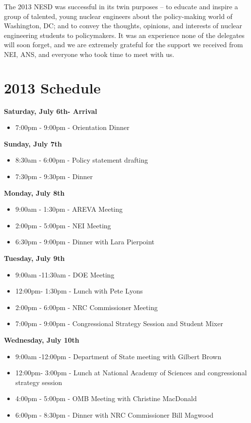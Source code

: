 \documentclass[12pt]{article}
\begin{document}
The 2013 NESD was successful in its twin purposes – to educate and inspire a
group of talented, young nuclear engineers about the policy-making world of
Washington, DC; and to convey the thoughts, opinions, and interests of nuclear
engineering students to policymakers.  It was an experience none of the
delegates will soon forget, and we are extremely grateful for the support we
received from NEI, ANS, and everyone who took time to meet with us.

\newpage
\section{2013 Schedule}

\textbf{Saturday, July 6th- Arrival}
\begin{itemize}
\item 7:00pm - 9:00pm - Orientation Dinner
\end{itemize}

\textbf{Sunday, July 7th}
\begin{itemize}
\item 8:30am - 6:00pm - Policy statement drafting
\item 7:30pm - 9:30pm - Dinner
\end{itemize}

\textbf{Monday, July 8th}
\begin{itemize}
\item 9:00am - 1:30pm - AREVA Meeting
\item 2:00pm - 5:00pm - NEI Meeting
\item 6:30pm - 9:00pm - Dinner with Lara Pierpoint
\end{itemize}

\textbf{Tuesday, July 9th}
\begin{itemize}
\item 9:00am -11:30am - DOE Meeting
\item 12:00pm- 1:30pm - Lunch with Pete Lyons
\item 2:00pm - 6:00pm - NRC Commissioner Meeting
\item 7:00pm - 9:00pm - Congressional Strategy Session and Student Mixer
\end{itemize}

\textbf{Wednesday, July 10th}
\begin{itemize}
\item 9:00am -12:00pm - Department of State meeting with Gilbert Brown
\item 12:00pm- 3:00pm - Lunch at National Academy of Sciences and congressional
  strategy session
\item 4:00pm - 5:00pm - OMB Meeting with Christine MacDonald
\item 6:00pm - 8:30pm - Dinner with NRC Commissioner Bill Magwood
\end{itemize}
\end{document}
